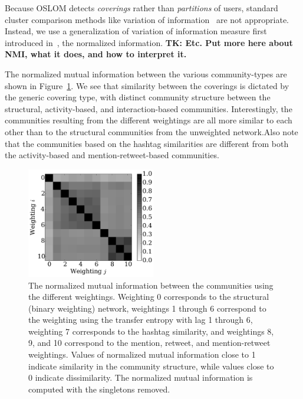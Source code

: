 Because OSLOM detects \emph{coverings} rather than \emph{partitions} of users, standard cluster comparison methods like variation of information~\cite{meilua2003comparing} are not appropriate. Instead, we use a generalization of variation of information measure first introduced in~\cite{lancichinetti2009detecting}, the normalized information. \textbf{TK: Etc. Put more here about NMI, what it does, and how to interpret it.}

The normalized mutual information between the various community-types are shown in Figure~\ref{Fig-compare_coverings}. We see that similarity between the coverings is dictated by the generic covering type, with distinct community structure between the structural, activity-based, and interaction-based communities. Interestingly, the communities resulting from the different weightings are all more similar to each other than to the structural communities from the unweighted network.Also note that the communities based on the hashtag similarities are different from both the activity-based and mention-retweet-based communities.

\begin{figure}[h!]
  \centering
\includegraphics[width=0.50\textwidth]{figures/nmi_singletons.pdf}
\caption{The normalized mutual information between the communities using the different weightings. Weighting 0 corresponds to the structural (binary weighting) network, weightings 1 through 6 correspond to the weighting using the transfer entropy with lag 1 through 6, weighting 7 corresponds to the hashtag similarity, and weightings 8, 9, and 10 correspond to the mention, retweet, and mention-retweet weightings. Values of normalized mutual information close to 1 indicate similarity in the community structure, while values close to 0 indicate dissimilarity. The normalized mutual information is computed with the singletons removed.}
\label{Fig-compare_coverings}
\end{figure}

